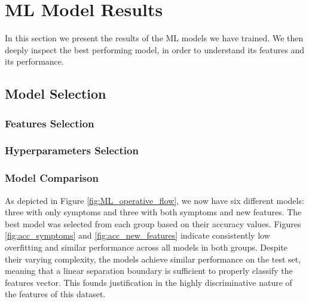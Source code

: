 \section{ML Model Results}
\label{sec:results_ML}
In this section we present the results of the ML models we have trained. We then deeply inspect the best performing model, 
in order to understand its features and its performance.



\subsection{Model Selection}
\label{subsec:results_ML_model_selection}

\subsubsection*{Features Selection}

\subsubsection*{Hyperparameters Selection}


\subsubsection*{Model Comparison} \label{subsubsec:results_ML_model_comparison}

As depicted in Figure \ref{fig:ML_operative_flow}, we now have six different models: three with only symptoms 
and three with both symptoms and new features. The best model was selected from each group based on their accuracy 
values. Figures \ref{fig:acc_symptoms} and \ref{fig:acc_new_features} indicate consistently low overfitting 
and similar performance across all models in both groups. Despite their varying complexity, the models achieve 
similar performance on the test set, meaning that a linear separation boundary is sufficient to properly classify
the features vector. This founds justification in the highly discriminative nature of the features of this dataset.

